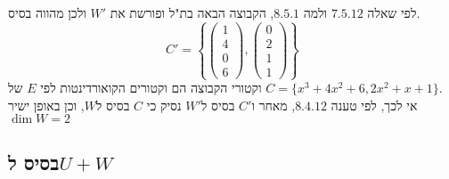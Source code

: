 \documentclass{article}
\begin{document}
לפי שאלה $7.5.12$ ולמה $8.5.1$, הקבוצה הבאה בת"ל ופורשת את $W'$ ולכן מהווה בסיס.
\[
    C'=\left\{
    \begin{pmatrix}
        1 \\
        4 \\
        0 \\
        6
    \end{pmatrix},
    \begin{pmatrix}
        0 \\
        2 \\
        1 \\
        1
    \end{pmatrix}
    \right\}
\]
וקטורי הקבוצה הם וקטורים הקואורדינטות לפי $E$ של $C=\{ x^3+4x^2+6, 2x^2+x+1 \}$.\\
אי לכך, לפי טענה $8.4.12$, מאחר ו$C'$ בסיס ל$W'$ נסיק כי $C$ בסיס ל$W$,
וכן באופן ישיר $\dim W=2$

\subsection*{בסיס ל$U+W$}
\end{document}
